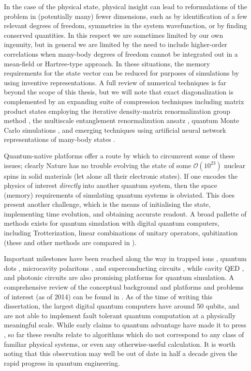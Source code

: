 	In the case of the physical state, physical insight can lead to reformulations of the problem in (potentially many) fewer dimensions, such as by identification of a few relevant degrees of freedom, symmetries in the system wavefunction, or by finding conserved quantities.
	In this respect we are sometimes limited by our own ingenuity, but in general we are limited by the need to include higher-order correlations when many-body degrees of freedom cannot be integrated out in a mean-field or Hartree-type approach.
	In these situations, the memory requirements for the state vector can  be reduced for purposes of simulations by using inventive representations.
	A full review of numerical techniques is far beyond the scope of this thesis, but we will note that exact diagonalization \cite{Zhang10} is complemented by an expanding suite of compression techniques including matrix product states \cite{Schollwock11} employing the iterative density-matrix renormalization group  method \cite{Dechiara08}, the multiscale entanglement renormalization ansatz \cite{Evenbly15}, quantum Monte Carlo simulations \cite{BeccaQMC}, and emerging techniques using artificial neural network representations of many-body states \cite{Carleo17}.

	Quantum-native platforms offer a route by which to circumvent some of these issues; clearly Nature has no trouble evolving the state of some $\mathcal{O}(10^{23})$ nuclear spins in solid materials (let alone all their electronic states).
	If one encodes the physics of interest \emph{directly} into another quantum system, then the space (memory) requirements of simulating quantum systems is obviated.
	This does present another challenge, which is the means of initialising the state, implementing time evolution, and obtaining accurate readout.
	A broad pallette of methods exists for quantum simulation with digital quantum computers, including Trotterization, linear combinations of unitary operators, qubitization (these and other methods are compared in \cite{Low19}).

	Important milestones have been reached along the way in trapped ions \cite{Hempel18}, quantum dots \cite{Hensgens17}, microcavity polaritons \cite{Boulier20}, and superconducting circuits \cite{Wilkinson20}, 
	while cavity QED \cite{Zhu18}, and photonic circuits \cite{Arrazola21} are also promising platforms for quantum simulation.
	A comprehensive review of the conceptual background and platforms and problems of interest (as of 2014) can be found in \cite{Georgescu14}.
	As of the time of writing this dissertation, the largest digital quantum computers have around 50 qubits, and are not able to implement fault tolerant quantum computation at a physically meaningful scale.
	While early claims to quantum advantage have made it to press \cite{Arute19}, so far these results relate to algorithms which do not correspond to any class of familiar physical systems, or even any otherwise-useful calculation.
	It is worth noting that this observation may well be out of date in half a decade given the rapid progress in quantum engineering.


